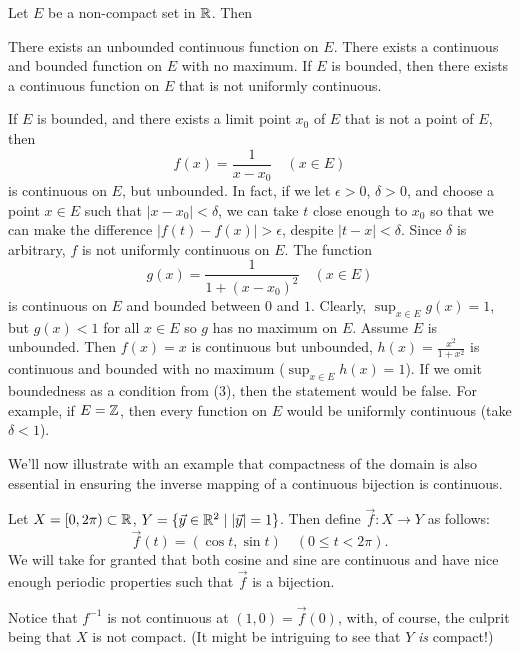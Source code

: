\documentclass{article}
\begin{document}
\begin{theorem}
    Let $E$ be a non-compact set in $\mathbb R$. Then 
    \begin{enumerate}
        \ii There exists an unbounded continuous function on $E$.
        \ii There exists a continuous and bounded function on $E$ with no maximum.
        \ii If $E$ is bounded, then there exists a continuous function on $E$ that is not uniformly continuous.
    \end{enumerate}
\end{theorem}
\begin{example}
    \listhack 
    \begin{enumerate}
        \ii If $E$ is bounded, and there exists a limit point $x_{0}$ of $E$ that is not a point of $E$, then \[f(x)=\frac{1}{x-x_{0}}\quad(x\in E)\]is continuous on $E$, but unbounded. In fact, if we let $\epsilon>0$, $\delta>0$, and choose a point $x\in E$  such that $|x-x_{0}|<\delta$, we can take $t$ close enough to $x_{0}$ so that we can make the difference $|f(t)-f(x)|>\epsilon$, despite $|t-x|<\delta$. Since $\delta$ is arbitrary, $f$ is not uniformly continuous on $E$.
        \ii The function \[g(x)=\frac{1}{1+(x-x_{0})^{2}}\quad(x\in E)\]is continuous on $E$ and bounded between $0$ and $1$. Clearly, $\sup_{x\in E}g(x)=1$, but $g(x)<1$ for all $x\in E$ so $g$ has no maximum on $E$.
        \ii Assume $E$ is unbounded. Then $f(x)=x$ is continuous but unbounded, $h(x)=\frac{x^{2}}{1+x^{2}}$ is continuous and bounded with no maximum ($\sup_{x\in E}h(x)=1$). 
        \ii If we omit boundedness as a condition from (3), then the statement would be false. For example, if $E=\mathbb Z$, then every function on $E$ would be uniformly continuous (take $\delta<1$).
    \end{enumerate}
\end{example}
We'll now illustrate with an example that compactness of the domain is also essential in ensuring the inverse mapping of a continuous bijection is continuous.
\begin{example}
    Let $X=[0,2\pi)\subset \mathbb R$, $Y=\{\vec{y}\in\mathbb R^{2}\mid |\vec{y}|=1\}$. Then define $\vec{f}:X\rightarrow{Y}$ as follows:
    \[\vec{f}(t)=(\cos{t},\sin{t})\quad(0\leq t<2\pi).\]We will take for granted that both cosine and sine are continuous and have nice enough periodic properties such that $\vec{f}$ is a bijection. 

    Notice that $f^{-1}$ is not continuous at $(1,0)=\vec{f}(0)$, with, of course, the culprit being that $X$ is not compact. (It might be intriguing to see that $Y$ \textit{is} compact!)
\end{example}
\end{document}
